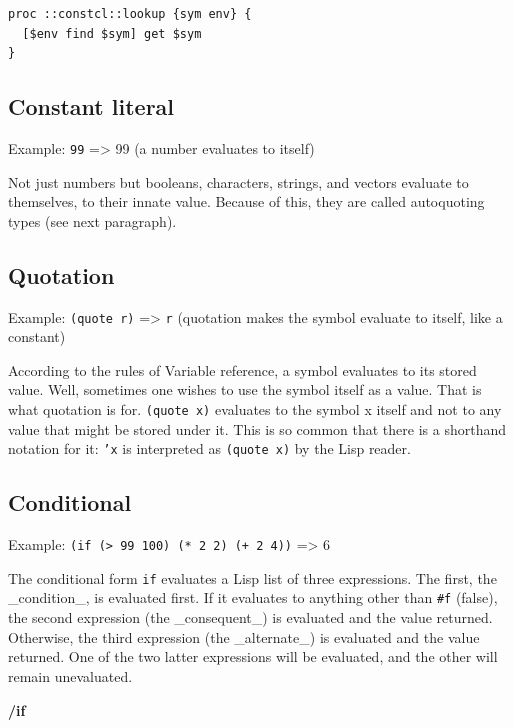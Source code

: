 \documentclass[twoside,9pt]{report}
\begin{document}
\noindent\makebox[\linewidth]{\rule{\linewidth}{0.4pt}}
\begin{lstlisting}
proc ::constcl::lookup {sym env} {
  [$env find $sym] get $sym
}
\end{lstlisting}
\noindent\makebox[\linewidth]{\rule{\linewidth}{0.4pt}}
\subsection{Constant literal}
\label{constant-literal}

Example: \texttt{99} => 99 (a number evaluates to itself)


Not just numbers but booleans, characters, strings, and vectors evaluate to themselves, to their innate value. Because of this, they are called autoquoting types (see next paragraph).

\subsection{Quotation}
\label{quotation}

Example: \texttt{(quote r)} => \texttt{r} (quotation makes the symbol evaluate to itself, like a constant)


According to the rules of Variable reference, a symbol evaluates to its stored value. Well, sometimes one wishes to use the symbol itself as a value. That is what quotation is for. \texttt{(quote x)} evaluates to the symbol x itself and not to any value that might be stored under it. This is so common that there is a shorthand notation for it: \texttt{'x} is interpreted as \texttt{(quote x)} by the Lisp reader.

\subsection{Conditional}
\label{conditional}

Example: \texttt{(if (> 99 100) (* 2 2) (+ 2 4))} => 6


The conditional form \texttt{if} evaluates a Lisp list of three expressions. The first, the \_condition\_, is evaluated first. If it evaluates to anything other than \texttt{\#f} (false), the second expression (the \_consequent\_) is evaluated and the value returned. Otherwise, the third expression (the \_alternate\_) is evaluated and the value returned. One of the two latter expressions will be evaluated, and the other will remain unevaluated.


\textbf{/if}
\end{document}
